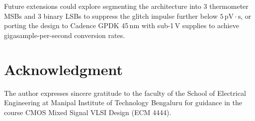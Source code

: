 \documentclass[conference,10pt]{IEEEtran}
\begin{document}
Future extensions could explore segmenting the architecture into 3 thermometer MSBs and 3 binary LSBs to suppress the glitch impulse further below $5\,\text{pV}\cdot\text{s}$, or porting the design to Cadence GPDK 45\,nm with sub-1\,V supplies to achieve gigasample-per-second conversion rates.

\section*{Acknowledgment}
The author expresses sincere gratitude to the faculty of the School of Electrical Engineering at Manipal Institute of Technology Bengaluru for guidance in the course CMOS Mixed Signal VLSI Design (ECM 4444).



\end{document}
